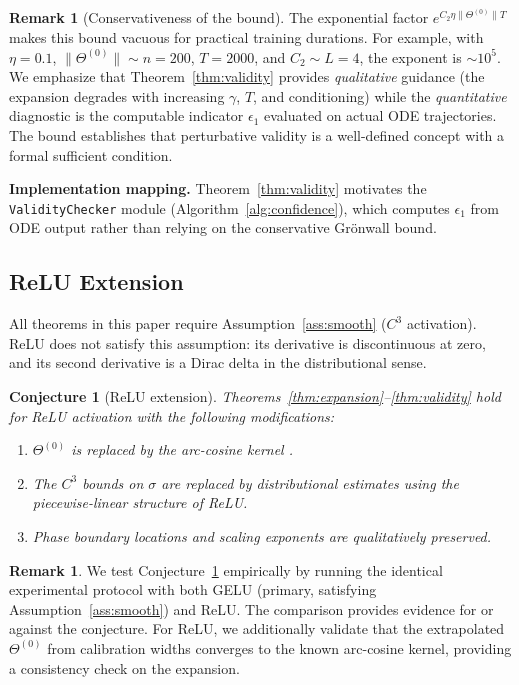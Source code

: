 \documentclass[11pt]{article}
\newtheorem{conjecture}[theorem]{Conjecture}
\theoremstyle{definition}
\newtheorem{remark}[theorem]{Remark}
\newcommand{\norm}[1]{\lVert #1 \rVert}
\renewcommand{\Theta}{\varTheta}
\begin{document}
\begin{remark}[Conservativeness of the bound]
The exponential factor $e^{C_2 \eta \norm{\Theta^{(0)}} T}$ makes this bound vacuous for practical training durations. For example, with $\eta = 0.1$, $\norm{\Theta^{(0)}} \sim n = 200$, $T = 2000$, and $C_2 \sim L = 4$, the exponent is $\sim 10^5$. We emphasize that Theorem~\ref{thm:validity} provides \emph{qualitative} guidance (the expansion degrades with increasing $\gamma$, $T$, and conditioning) while the \emph{quantitative} diagnostic is the computable indicator $\epsilon_1$ evaluated on actual ODE trajectories. The bound establishes that perturbative validity is a well-defined concept with a formal sufficient condition.
\end{remark}

\textbf{Implementation mapping.} Theorem~\ref{thm:validity} motivates the \texttt{ValidityChecker} module (Algorithm~\ref{alg:confidence}), which computes $\epsilon_1$ from ODE output rather than relying on the conservative Gr\"onwall bound.

\subsection{ReLU Extension}
\label{sec:relu}

All theorems in this paper require Assumption~\ref{ass:smooth} ($C^3$ activation). ReLU does not satisfy this assumption: its derivative is discontinuous at zero, and its second derivative is a Dirac delta in the distributional sense.

\begin{conjecture}[ReLU extension]
\label{conj:relu}
Theorems~\ref{thm:expansion}--\ref{thm:validity} hold for ReLU activation with the following modifications:
\begin{enumerate}[label=(\roman*)]
\item $\Theta^{(0)}$ is replaced by the arc-cosine kernel \citep{cho2009kernel}.
\item The $C^3$ bounds on $\sigma$ are replaced by distributional estimates using the piecewise-linear structure of ReLU.
\item Phase boundary locations and scaling exponents are qualitatively preserved.
\end{enumerate}
\end{conjecture}

\begin{remark}
We test Conjecture~\ref{conj:relu} empirically by running the identical experimental protocol with both GELU (primary, satisfying Assumption~\ref{ass:smooth}) and ReLU. The comparison provides evidence for or against the conjecture. For ReLU, we additionally validate that the extrapolated $\Theta^{(0)}$ from calibration widths converges to the known arc-cosine kernel, providing a consistency check on the expansion.
\end{remark}
\end{document}
